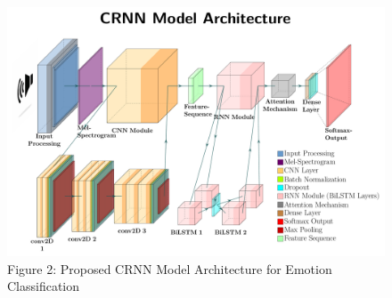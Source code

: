 \documentclass[../main.tex]{subfiles}
\begin{document}
\begin{figure}[h]
    \centering
    \includegraphics[width=\textwidth]{../figure/architecture_figure.pdf}
    \caption{Figure 2: Proposed CRNN Model Architecture for Emotion Classification}
    \label{fig:architecture}
\end{figure}
\end{document}
